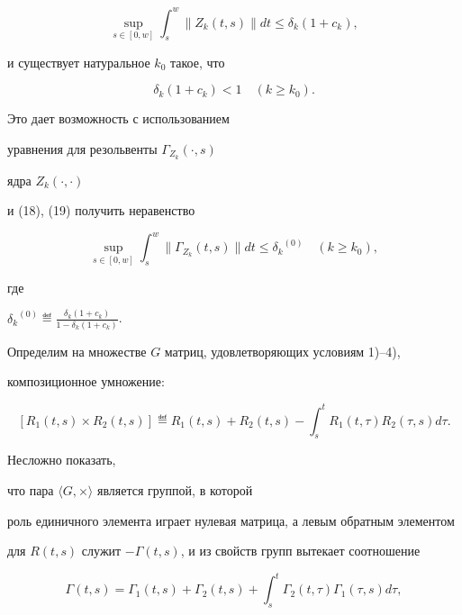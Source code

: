 \begin{pf}
\begin{equation}
\sup_{s\in[0,w]}\int_s^w\|Z_k(t,s)\|dt\le \delta_k(1+c_k),


\end{equation}


и существует натуральное $k_0$ такое, что


\begin{equation}


\delta_k(1+c_k)<1\quad (k\ge k_0).


\end{equation}


Это дает возможность с использованием


уравнения для резольвенты $\Gamma_{Z_k}(\cdot,s)$


ядра $Z_k(\cdot,\cdot)$


и (18), (19) получить неравенство


\begin{equation}


\sup_{s\in[0,w]}\int_s^w\|\Gamma_{Z_k}(t,s)\|dt\le


{\delta_k}^{(0)} \quad (k\ge k_0),


\end{equation}


где


${\delta_k}^{(0)}\eqdef \frac{\delta_k(1+c_k)}{1-\delta_k(1+c_k)}$.





Определим на множестве $G$ матриц, удовлетворяющих условиям 1)--4),


композиционное умножение:


$$


[R_1(t,s)\times R_2(t,s)]\eqdef


R_1(t,s)+R_2(t,s)-\int_s^tR_1(t,\tau)R_2(\tau,s)d\tau.


$$


Несложно показать,


что пара $\langle G,\times\rangle$ является группой, в которой


роль единичного элемента играет нулевая матрица, а левым обратным элементом


для $R(t,s)$ служит $-\Gamma(t,s)$, и из свойств групп вытекает соотношение


\begin{equation}


\Gamma(t,s)=\Gamma_1(t,s)+\Gamma_2(t,s)+


\int_s^t\Gamma_2(t,\tau)\Gamma_1(\tau,s)d\tau,


\end{equation}



\end{pf}
